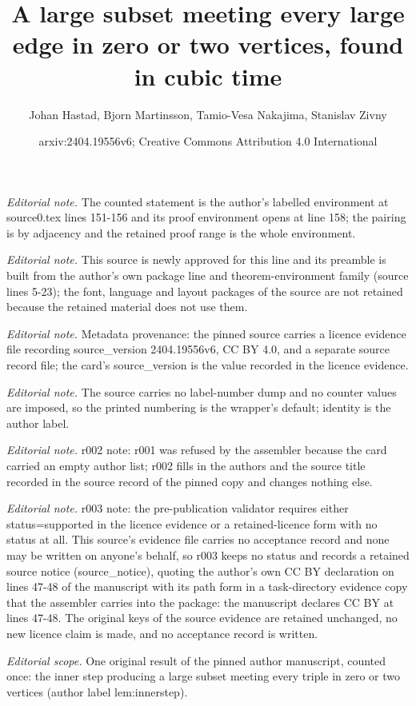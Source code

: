 \documentclass[10pt,a4paper]{article}
\title{A large subset meeting every large edge in zero or two vertices, found in cubic time}
\author{Johan Hastad, Bjorn Martinsson, Tamio-Vesa Nakajima, Stanislav Zivny}
\date{arxiv:2404.19556v6; Creative Commons Attribution 4.0 International}
\theoremstyle{plain}
\theoremstyle{definition}
\begin{document}
\maketitle
\noindent\textit{Editorial note.} The counted statement is the author's labelled environment at source0.tex lines 151-156 and its proof environment opens at line 158; the pairing is by adjacency and the retained proof range is the whole environment.\par\medskip
\noindent\textit{Editorial note.} This source is newly approved for this line and its preamble is built from the author's own package line and theorem-environment family (source lines 5-23); the font, language and layout packages of the source are not retained because the retained material does not use them.\par\medskip
\noindent\textit{Editorial note.} Metadata provenance: the pinned source carries a licence evidence file recording source\_version 2404.19556v6, CC BY 4.0, and a separate source record file; the card's source\_version is the value recorded in the licence evidence.\par\medskip
\noindent\textit{Editorial note.} The source carries no label-number dump and no counter values are imposed, so the printed numbering is the wrapper's default; identity is the author label.\par\medskip
\noindent\textit{Editorial note.} r002 note: r001 was refused by the assembler because the card carried an empty author list; r002 fills in the authors and the source title recorded in the source record of the pinned copy and changes nothing else.\par\medskip
\noindent\textit{Editorial note.} r003 note: the pre-publication validator requires either status=supported in the licence evidence or a retained-licence form with no status at all. This source's evidence file carries no acceptance record and none may be written on anyone's behalf, so r003 keeps no status and records a retained source notice (source\_notice), quoting the author's own CC BY declaration on lines 47-48 of the manuscript with its path form in a task-directory evidence copy that the assembler carries into the package: the manuscript declares CC BY at lines 47-48. The original keys of the source evidence are retained unchanged, no new licence claim is made, and no acceptance record is written.\par\medskip
\noindent\textit{Editorial scope.} One original result of the pinned author manuscript, counted once: the inner step producing a large subset meeting every triple in zero or two vertices (author label lem:innerstep).\par\medskip
\end{document}
